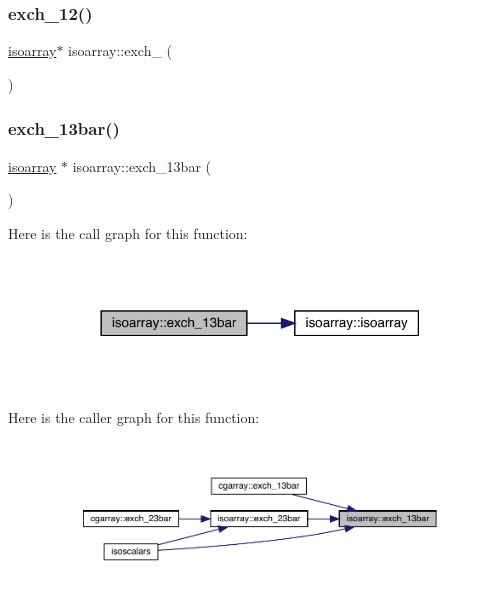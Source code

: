 \subsubsection{\texorpdfstring{exch\_12()}{exch\_12()}\hspace{0.1cm}{\footnotesize\ttfamily [2/2]}}
{\footnotesize\ttfamily \mbox{\hyperlink{classisoarray}{isoarray}}$\ast$ isoarray\+::exch\+\_ (\begin{DoxyParamCaption}{ }\end{DoxyParamCaption})}

\mbox{\label{classisoarray_ac9b13ab94dad05014c087cc89776eeff}} 
\subsubsection{\texorpdfstring{exch\_13bar()}{exch\_13bar()}\hspace{0.1cm}{\footnotesize\ttfamily [1/2]}}
{\footnotesize\ttfamily \mbox{\hyperlink{classisoarray}{isoarray}} $\ast$ isoarray\+::exch\+\_\+13bar (\begin{DoxyParamCaption}{ }\end{DoxyParamCaption})}

Here is the call graph for this function\+:\nopagebreak
\begin{figure}[H]
\begin{center}
\leavevmode
\includegraphics[width=318pt]{d5/dd9/classisoarray_ac9b13ab94dad05014c087cc89776eeff_cgraph}
\end{center}
\end{figure}
Here is the caller graph for this function\+:\nopagebreak
\begin{figure}[H]
\begin{center}
\leavevmode
\includegraphics[width=350pt]{d5/dd9/classisoarray_ac9b13ab94dad05014c087cc89776eeff_icgraph}
\end{center}
\end{figure}
\mbox{\label{classisoarray_a0fd60ac09d139d86f9cf8fa18fa5577d}} 
